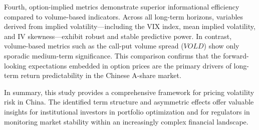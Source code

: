 \documentclass[a4paper, 12pt]{article}    %
\begin{document}
Fourth, option-implied metrics demonstrate superior informational efficiency compared to volume-based indicators. Across all long-term horizons, variables derived from implied volatility—including the VIX index, mean implied volatility, and IV skewness—exhibit robust and stable predictive power. In contrast, volume-based metrics such as the call-put volume spread ($VOLD$) show only sporadic medium-term significance. This comparison confirms that the forward-looking expectations embedded in option prices are the primary drivers of long-term return predictability in the Chinese A-share market.

In summary, this study provides a comprehensive framework for pricing volatility risk in China. The identified term structure and asymmetric effects offer valuable insights for institutional investors in portfolio optimization and for regulators in monitoring market stability within an increasingly complex financial landscape.


\end{document}
